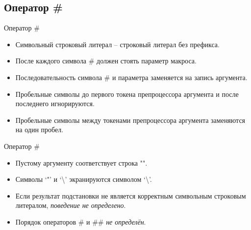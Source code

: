     \subsection{Оператор \#}
    \begin{frame}{Оператор \#}
        \begin{itemize}
            \item Символьный строковый литерал -- строковый литерал без префикса.
            \item После каждого символа \# должен стоять параметр макроса.
            \item Последовательность символа \# и параметра заменяется
                на запись аргумента.
            \item Пробельные символы до первого токена препроцессора аргумента
                и после последнего игнорируются.
            \item Пробельные символы между токенами препроцессора аргумента
                заменяются на один пробел.
        \end{itemize}
    \end{frame}
    \begin{frame}{Оператор \#}
        \begin{itemize}
            \item Пустому аргументу соответствует строка "".
            \item Символы `"' и `\textbackslash' экранируются символом `\textbackslash'.
            \item Если результат подстановки не является корректным символьным строковым литералом,
                \textit{поведение не определено}.
            \item Порядок операторов \# и \#\# \textit{не определён}.
        \end{itemize}
    \end{frame}
